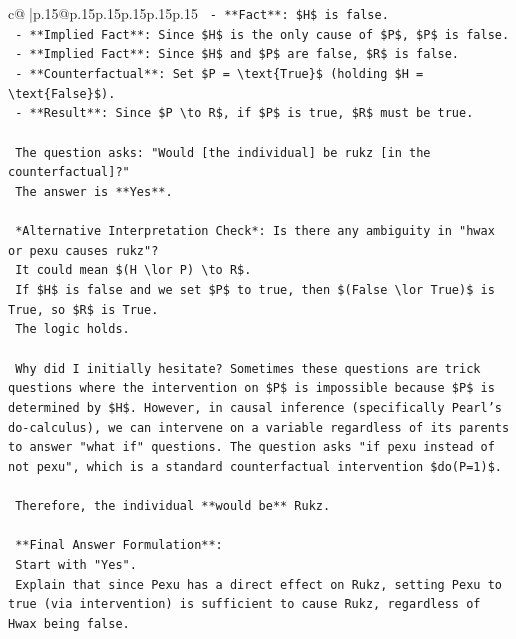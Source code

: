 \documentclass{article}
\begin{document}
{\begin{supertabular}{c@{$\;$}|p{.15\linewidth}@{}p{.15\linewidth}p{.15\linewidth}p{.15\linewidth}p{.15\linewidth}p{.15\linewidth}}
{{{\texttt{    {-} **Fact**: \$H\$ is false.} \\
\texttt{    {-} **Implied Fact**: Since \$H\$ is the only cause of \$P\$, \$P\$ is false.} \\
\texttt{    {-} **Implied Fact**: Since \$H\$ and \$P\$ are false, \$R\$ is false.} \\
\texttt{    {-} **Counterfactual**: Set \$P = \textbackslash{}text\{True\}\$ (holding \$H = \textbackslash{}text\{False\}\$).} \\
\texttt{    {-} **Result**: Since \$P \textbackslash{}to R\$, if \$P\$ is true, \$R\$ must be true.} \\
\\ 
\texttt{    The question asks: "Would {[}the individual{]} be rukz {[}in the counterfactual{]}?"} \\
\texttt{    The answer is **Yes**.} \\
\\ 
\texttt{    *Alternative Interpretation Check*: Is there any ambiguity in "hwax or pexu causes rukz"?} \\
\texttt{    It could mean \$(H \textbackslash{}lor P) \textbackslash{}to R\$.} \\
\texttt{    If \$H\$ is false and we set \$P\$ to true, then \$(False \textbackslash{}lor True)\$ is True, so \$R\$ is True.} \\
\texttt{    The logic holds.} \\
\\ 
\texttt{    Why did I initially hesitate? Sometimes these questions are trick questions where the intervention on \$P\$ is impossible because \$P\$ is determined by \$H\$. However, in causal inference (specifically Pearl's do{-}calculus), we can intervene on a variable regardless of its parents to answer "what if" questions. The question asks "if pexu instead of not pexu", which is a standard counterfactual intervention \$do(P=1)\$.} \\
\\ 
\texttt{    Therefore, the individual **would be** Rukz.} \\
\\ 
\texttt{    **Final Answer Formulation**:} \\
\texttt{    Start with "Yes".} \\
\texttt{    Explain that since Pexu has a direct effect on Rukz, setting Pexu to true (via intervention) is sufficient to cause Rukz, regardless of Hwax being false.} \\
\\ 
}}}
\end{supertabular}}
\end{document}
